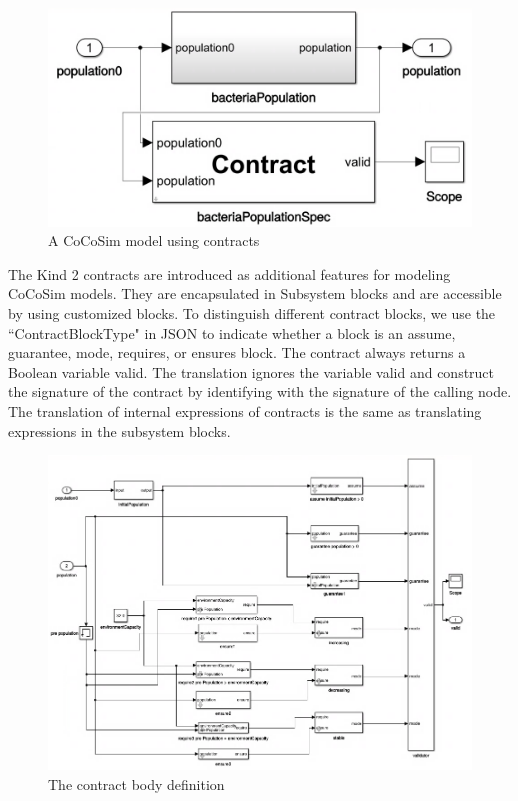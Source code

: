 \documentclass{article}
\begin{document}
\begin{figure}[h]
\begin{center}
  \includegraphics[scale=0.2]{figures/contract}    
\end{center}  
  \caption{A CoCoSim model using contracts}
  \label{contractmodel}
\end{figure}


The Kind 2 contracts are introduced as additional features for modeling CoCoSim models.
They are encapsulated in \textsf{Subsystem} blocks and are accessible by using customized 
blocks.
To distinguish different contract blocks, we use the \textsf{``ContractBlockType"} in JSON to indicate whether a block 
is an \textsf{assume}, \textsf{guarantee}, \textsf{mode}, \textsf{requires}, or \textsf{ensures} block.
The contract always returns a Boolean variable \textsf{valid}.
The translation ignores the variable \textsf{valid} and construct the signature 
of the contract by identifying with the signature of the calling node.
The translation of internal expressions of contracts is the same as translating expressions in the subsystem blocks.

\begin{figure}[h]
\begin{center}
  \includegraphics[scale=0.5]{figures/contract1}    
\end{center}  
  \caption{The contract body definition}
  \label{contractdef}
\end{figure}
\end{document}
